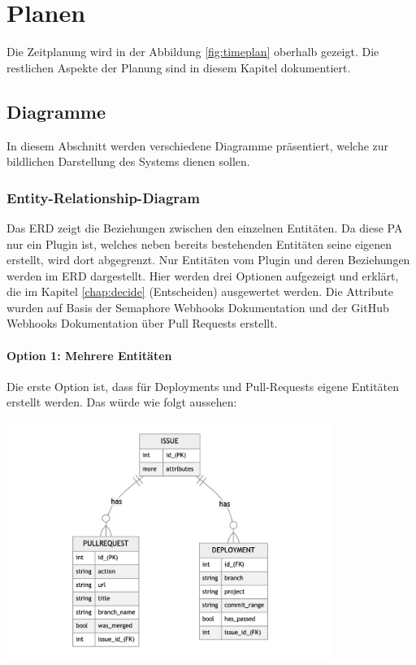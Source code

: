 \chapter{Planen}
\label{chap:plan}
Die Zeitplanung wird in der Abbildung \ref{fig:timeplan} oberhalb gezeigt. Die restlichen Aspekte der Planung sind in diesem Kapitel dokumentiert.

\section{Diagramme}
In diesem Abschnitt werden verschiedene Diagramme präsentiert, welche zur bildlichen Darstellung des Systems dienen sollen.
\subsection{Entity-Relationship-Diagram}
Das ERD zeigt die Beziehungen zwischen den einzelnen Entitäten. Da diese PA nur ein Plugin ist, welches neben
bereits bestehenden Entitäten seine eigenen erstellt, wird dort abgegrenzt. Nur Entitäten vom Plugin und
deren Beziehungen werden im ERD dargestellt. \newline
Hier werden drei Optionen aufgezeigt und erklärt, die im Kapitel \ref{chap:decide} (Entscheiden) ausgewertet werden. \newline
Die Attribute wurden auf Basis der Semaphore Webhooks Dokumentation \cite{semaphore_webhooks} und der GitHub Webhooks
Dokumentation über Pull Requests \cite{github_webhooks_pr} erstellt.

\begin{minipage}{\textwidth}
  \subsubsection{Option 1: Mehrere Entitäten}
  Die erste Option ist, dass für Deployments und Pull-Requests eigene Entitäten erstellt werden. Das würde wie folgt aussehen:
  \begin{center}
    \includegraphics[width=0.8\textwidth]{images/erd/multiple.png}
    \label{fig:erd_multiple}
  \end{center}
\end{minipage}

